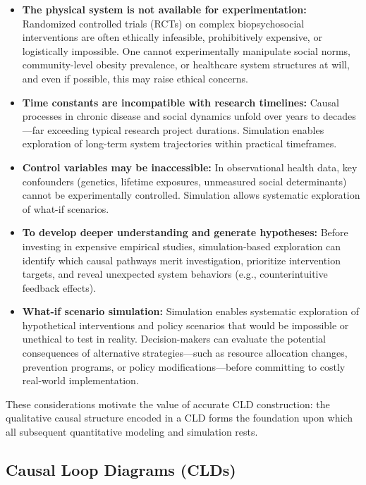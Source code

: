 \begin{itemize}
    \item \textbf{The physical system is not available for experimentation:} Randomized controlled trials (RCTs) on complex biopsychosocial interventions are often ethically infeasible, prohibitively expensive, or logistically impossible. One cannot experimentally manipulate social norms, community-level obesity prevalence, or healthcare system structures at will, and even if possible, this may raise ethical concerns.
    \item \textbf{Time constants are incompatible with research timelines:} Causal processes in chronic disease and social dynamics unfold over years to decades---far exceeding typical research project durations. Simulation enables exploration of long-term system trajectories within practical timeframes.
    \item \textbf{Control variables may be inaccessible:} In observational health data, key confounders (genetics, lifetime exposures, unmeasured social determinants) cannot be experimentally controlled. Simulation allows systematic exploration of what-if scenarios.
    \item \textbf{To develop deeper understanding and generate hypotheses:} Before investing in expensive empirical studies, simulation-based exploration can identify which causal pathways merit investigation, prioritize intervention targets, and reveal unexpected system behaviors (e.g., counterintuitive feedback effects).
    \item \textbf{What-if scenario simulation:} Simulation enables systematic exploration of hypothetical interventions and policy scenarios that would be impossible or unethical to test in reality. Decision-makers can evaluate the potential consequences of alternative strategies---such as resource allocation changes, prevention programs, or policy modifications---before committing to costly real-world implementation.
\end{itemize}

\noindent
These considerations motivate the value of accurate CLD construction: the qualitative causal structure encoded in a CLD forms the foundation upon which all subsequent quantitative modeling and simulation rests.

\subsection{Causal Loop Diagrams (CLDs)}
\label{sec:background_clds}


